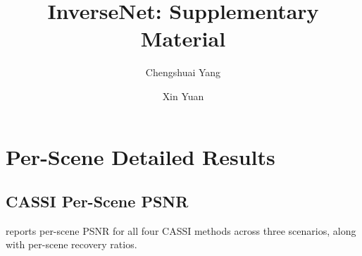 \documentclass[runningheads]{llncs}
\begin{document}
\title{InverseNet: Supplementary Material}
\author{Chengshuai Yang \and Xin Yuan}
\maketitle

\section{Per-Scene Detailed Results}
\label{sec:per_scene}

\subsection{CASSI Per-Scene PSNR}

 reports per-scene PSNR for all four CASSI methods across three scenarios, along with per-scene recovery ratios.
\end{document}
